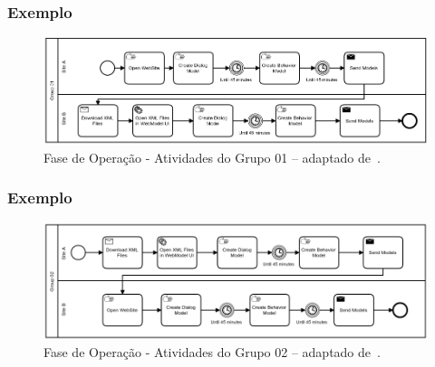 \documentclass[aspectratio=169]{beamer}
\begin{document}
\begin{frame}
\frametitle{Exemplo}
\justifying

\begin{figure}
\centering
\includegraphics[scale=0.32]{images/grupo01.png}
\caption{Fase de Operação - Atividades do Grupo 01 -- adaptado de~\cite{martins}.}
\label{image:grupo01}
\end{figure}

\end{frame}

\begin{frame}
\frametitle{Exemplo}
\justifying

\begin{figure}
\centering
\includegraphics[scale=0.3]{images/grupo02.png}
\caption{Fase de Operação - Atividades do Grupo 02 -- adaptado de~\cite{martins}.}
\label{image:grupo02}
\end{figure}


\end{frame}
\end{document}
